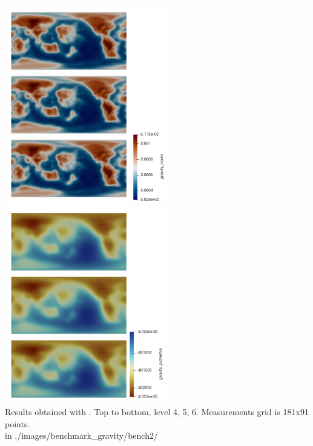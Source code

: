 \begin{center}
\includegraphics[width=7cm]{./images/benchmark_gravity/bench2/g}
\includegraphics[width=7cm]{./images/benchmark_gravity/bench2/U}\\
{\captionfont Results obtained with \aspect{}. Top to bottom, level 4, 5, 6.
Measurements grid is 181x91 points.\\
{\tiny {\color{gray} in ./images/benchmark\_gravity/bench2/}}
}
\end{center}

